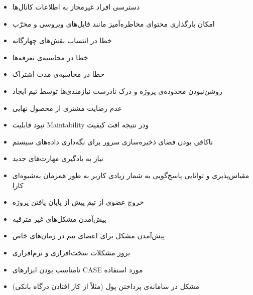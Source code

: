         \begin{itemize}
            \item دسترسی افراد غیرمجاز به اطلاعات کانال‌ها
            \item امکان بارگذاری محتوای مخاطره‌آمیز مانند فایل‌های ویروسی و مخرّب
            \item خطا در انتساب نقش‌های چهارگانه
            \item خطا در محاسبه‌ی تعرفه‌ها
            \item خطا در محاسبه‌ی مدت اشتراک
        \end{itemize}

        \begin{itemize}
            \item روشن‌نبودن محدوده‌ی پروژه و درک نادرست نیازمندی‌ها توسط تیم ایجاد
            \item عدم رضایت مشتری از محصول نهایی
        \end{itemize}

        \begin{itemize}
            \item نبود قابلیت Maintability ودر نتیجه افت کیفیت
            \item ناکافی بودن فضای ذخیره‌سازی سرور برای نگه‌داری داده‌های سیستم
            \item نیاز به یادگیری مهارت‌های جدید
            \item مقیاس‌پذیری و توانایی پاسخ‌گویی به شمار زیادی کاربر به طور همزمان به‌شیوه‌ای کارا
        \end{itemize}

        \begin{itemize}
            \item خروج عضوی از تیم پیش از پایان یافتن پروژه
            \item پیش‌آمدن مشکل‌های غیر مترقبه
            \item پیش‌آمدن مشکل برای اعضای تیم در زمان‌های خاص
        \end{itemize}

        \begin{itemize}
            \item بروز مشکلات سخت‌افزاری و نرم‌افزاری
            \item نامناسب بودن ابزارهای CASE مورد استفاده
            \item مشکل در سامانه‌ی پرداختن پول (مثلاً از کار افتادن درگاه بانکی)
        \end{itemize}

